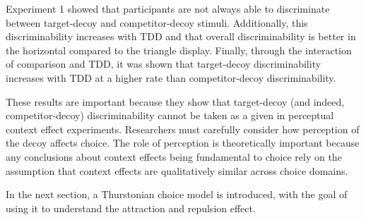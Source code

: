 Experiment 1 showed that participants are not always able to discriminate between target-decoy and competitor-decoy stimuli. Additionally, this discriminability increases with TDD and that overall discriminability is better in the horizontal compared to the triangle display. Finally, through the interaction of comparison and TDD, it was shown that target-decoy discriminability increases with TDD at a higher rate than competitor-decoy discriminability. 





These results are important because they show that target-decoy (and indeed, competitor-decoy) discriminability cannot be taken as a given in perceptual context effect experiments. Researchers must carefully consider how perception of the decoy affects choice. The role of perception is theoretically important because any conclusions about context effects being fundamental to choice \parencite{trueblood2013not} rely on the assumption that context effects are qualitatively similar across choice domains.

In the next section, a Thurstonian choice model is introduced, with the goal of using it to understand the attraction and repulsion effect. 

